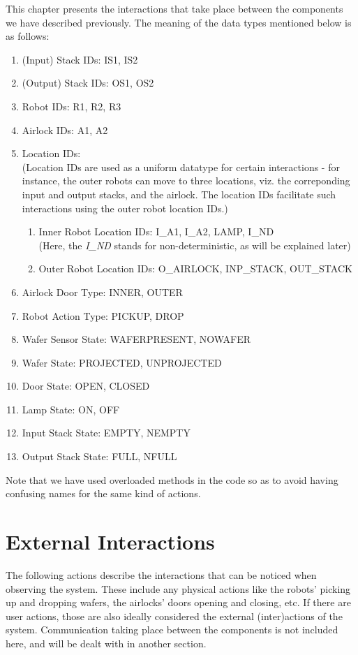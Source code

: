 
This chapter presents the interactions that take place between the components we have described previously. The meaning of the data types mentioned below is as follows:

\begin{enumerate}
    \item (Input) Stack IDs: IS1, IS2
    \item (Output) Stack IDs: OS1, OS2
    \item Robot IDs: R1, R2, R3
    \item Airlock IDs: A1, A2
    \item Location IDs:\\
    (Location IDs are used as a uniform datatype for certain interactions - for instance, the outer robots can move to three locations, viz. the correponding input and output stacks, and the airlock. The location IDs facilitate such interactions using the outer robot location IDs.)
        \begin{enumerate}
            \item Inner Robot Location IDs: I\_A1, I\_A2, LAMP, I\_ND\\
            (Here, the \textit{I_ND} stands for non-deterministic, as will be explained later)
            \item Outer Robot Location IDs: O\_AIRLOCK, INP\_STACK, OUT\_STACK
        \end{enumerate}
    \item Airlock Door Type: INNER, OUTER
    \item Robot Action Type: PICKUP, DROP
    \item Wafer Sensor State: WAFERPRESENT, NOWAFER
    \item Wafer State: PROJECTED, UNPROJECTED
    \item Door State: OPEN, CLOSED
    \item Lamp State: ON, OFF
    \item Input Stack State: EMPTY, NEMPTY
    \item Output Stack State: FULL, NFULL
\end{enumerate}

Note that we have used overloaded methods in the code so as to avoid having confusing names for the same kind of actions.

\section{External Interactions}

The following actions describe the interactions that can be noticed when observing the system. These include any physical actions like the robots' picking up and dropping wafers, the airlocks' doors opening and closing, etc. If there are user actions, those are also ideally considered the external (inter)actions of the system. Communication taking place between the components is not included here, and will be dealt with in another section.\\

